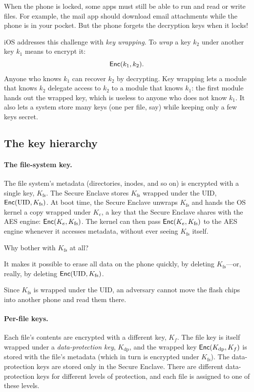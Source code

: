 When the phone is locked, some apps must still be able to run and read or
write files.
For example, the mail app should download email attachments while the
phone is in your pocket.
But the phone forgets the decryption keys when it locks!

iOS addresses this challenge with \emph{key wrapping}.
To \emph{wrap} a key $k_2$ under another key $k_1$ means to encrypt it:
\[
  \mathsf{Enc}(k_1, k_2).
\]
Anyone who knows $k_1$ can recover $k_2$ by decrypting.
Key wrapping lets a module that knows $k_2$ delegate access to $k_2$ to a
module that knows $k_1$: the first module hands out the wrapped key, which
is useless to anyone who does not know $k_1$.
It also lets a system store many keys (one per file, say) while keeping
only a few keys secret.

\subsection{The key hierarchy}

\paragraph{The file-system key.}
The file system's metadata (directories, inodes, and so on) is encrypted
with a single key, $K_\text{fs}$.
The Secure Enclave stores $K_\text{fs}$ wrapped under the UID,
$\mathsf{Enc}(\text{UID}, K_\text{fs})$.
At boot time, the Secure Enclave unwraps $K_\text{fs}$ and hands the OS
kernel a copy wrapped under $K_e$, a key that the Secure Enclave shares
with the AES engine: $\mathsf{Enc}(K_e, K_\text{fs})$.
The kernel can then pass $\mathsf{Enc}(K_e, K_\text{fs})$ to the AES engine
whenever it accesses metadata, without ever seeing $K_\text{fs}$ itself.

Why bother with $K_\text{fs}$ at all?
\begin{compactitem}
  \item It makes it possible to erase all data on the phone quickly, by
        deleting $K_\text{fs}$---or, really, by deleting
        $\mathsf{Enc}(\text{UID}, K_\text{fs})$.
  \item Since $K_\text{fs}$ is wrapped under the UID, an adversary cannot
        move the flash chips into another phone and read them there.
\end{compactitem}

\paragraph{Per-file keys.}
Each file's contents are encrypted with a different key, $K_f$.
The file key is itself wrapped under a \emph{data-protection key},
$K_\text{dp}$, and the wrapped key $\mathsf{Enc}(K_\text{dp}, K_f)$ is stored
with the file's metadata (which in turn is encrypted under $K_\text{fs}$).
The data-protection keys are stored only in the Secure Enclave.
There are different data-protection keys for different levels of
protection, and each file is assigned to one of these levels.

